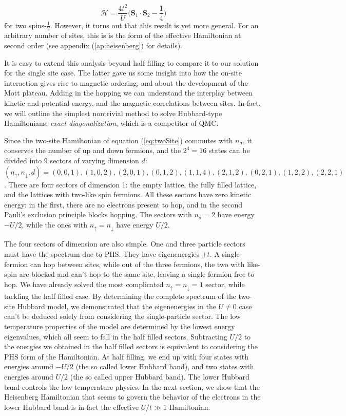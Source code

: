 \begin{equation}
\mathcal{H} = \frac{4t^2}{U} \bigg( \bm S_1 \cdot \bm S_2 - \frac{1}{4} \bigg)
\end{equation}
for two spins-$\frac{1}{2}$.
However, it turns out that this result is yet more general.
For an arbitrary number of sites, this is is the form of the effective Hamiltonian at second order (see appendix (\ref{ap:heisenberg}) for details).

It is easy to extend this analysis beyond half filling  to compare it to our solution for the single site case.
The latter gave us some insight into how the on-site interaction gives rise to magnetic ordering, and about the development of the Mott plateau.
Adding in the hopping we can understand the interplay between kinetic and potential energy, and the magnetic correlations between sites.
In fact, we will outline the simplest nontrivial method to solve Hubbard-type Hamiltonians: \emph{exact diagonalization}, which is a competitor of \acs{QMC}.

Since the two-site Hamiltonian of equation (\ref{eq:twoSite}) commutes with $n_\sigma$, it conserves the number of up and down fermions, and the $2^4 = 16$ states can be divided into 9 sectors of varying dimension $d$: $(n_\uparrow, n_\downarrow, d) = (0, 0, 1), (1, 0, 2), (2, 0, 1), (0, 1, 2), (1, 1, 4), (2, 1, 2), (0, 2, 1), (1, 2, 2), (2,2, 1)$.
There are four sectors of dimension 1: the empty lattice, the fully filled lattice, and the lattices with two-like spin fermions.
All these sectors have zero kinetic energy: in the first, there are no electrons present to hop, and in the second Pauli's exclusion principle blocks hopping.
The sectors with $n_\sigma = 2$ have energy $- U / 2$, while the ones with $n_\uparrow = n_\downarrow$ have energy $U / 2$.

The four sectors of dimension are also simple.
One and three particle sectors must have the spectrum due to \acf{PHS}.
They have eigenenergies $\pm t$.
A single fermion can hop between sites, while out of the three fermions, the two with like-spin are blocked and can't hop to the same site, leaving a single fermion free to hop.
We have already solved the most complicated $n_\uparrow = n_\downarrow = 1$ sector, while tackling the half filled case.
By determining the complete spectrum of the two-site Hubbard model, we demonstrated that the eigenenergies in the $U \neq 0$ case can't be deduced solely from considering the single-particle sector.
The low temperature properties of the model are determined by the lowest energy eigenvalues, which all seem to fall in the half filled sectors.
Subtracting $U / 2$ to the energies we obtained in the half filled sectors is equivalent to considering the \acs{PHS} form of the Hamiltonian. 
At half filling, we end up with four states with energies around $-U / 2$ (the so called lower Hubbard band), and two states with energies around $U / 2$ (the so called upper Hubbard band).
The lower Hubbard band controls the low temperature physics.
In the next section, we show that the Heisenberg Hamiltonian that seems to govern the behavior of the electrons in the lower Hubbard band is in fact the effective $U / t \gg 1$ Hamiltonian.

